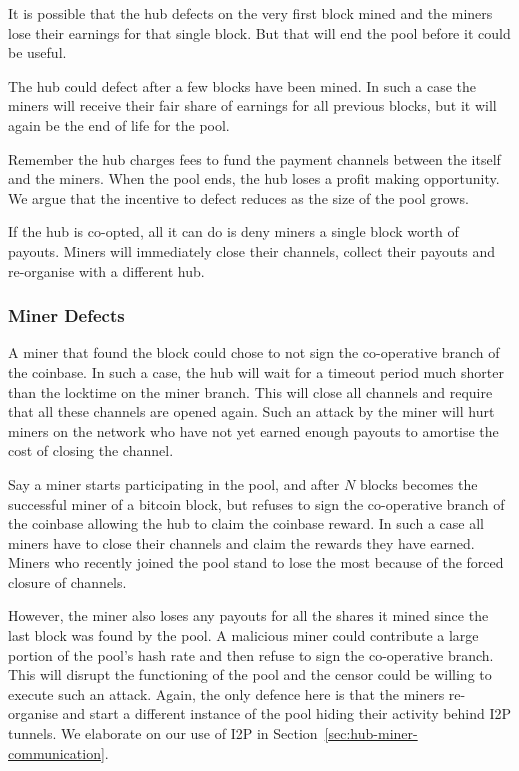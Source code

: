\documentclass{article}
\begin{document}
It is possible that the hub defects on the very first block mined and
the miners lose their earnings for that single block. But that will
end the pool before it could be useful.

The hub could defect after a few blocks have been mined. In such a
case the miners will receive their fair share of earnings for all
previous blocks, but it will again be the end of life for the pool.

Remember the hub charges fees to fund the payment channels between the
itself and the miners. When the pool ends, the hub loses a profit
making opportunity. We argue that the incentive to defect reduces as
the size of the pool grows.

If the hub is co-opted, all it can do is deny miners a single block
worth of payouts. Miners will immediately close their channels,
collect their payouts and re-organise with a different hub.

\subsubsection{Miner Defects}\label{ref:miner-defects}

A miner that found the block could chose to not sign the co-operative
branch of the coinbase. In such a case, the hub will wait for a
timeout period much shorter than the locktime on the miner
branch. This will close all channels and require that all these
channels are opened again. Such an attack by the miner will hurt
miners on the network who have not yet earned enough payouts to
amortise the cost of closing the channel.

Say a miner starts participating in the pool, and after $N$ blocks
becomes the successful miner of a bitcoin block, but refuses to sign
the co-operative branch of the coinbase allowing the hub to claim the
coinbase reward. In such a case all miners have to close their
channels and claim the rewards they have earned. Miners who recently
joined the pool stand to lose the most because of the forced closure
of channels.

However, the miner also loses any payouts for all the shares it mined
since the last block was found by the pool. A malicious miner could
contribute a large portion of the pool's hash rate and then refuse to
sign the co-operative branch. This will disrupt the functioning of the
pool and the censor could be willing to execute such an attack. Again,
the only defence here is that the miners re-organise and start a
different instance of the pool hiding their activity behind I2P
tunnels. We elaborate on our use of I2P in
Section~\ref{sec:hub-miner-communication}.
\end{document}
